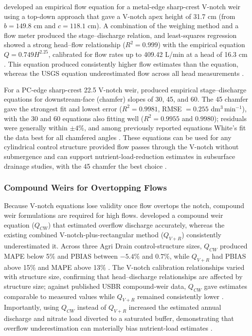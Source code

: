 \documentclass[11pt]{article}
\begin{document}
\textcite{BinShokrana2021} developed an empirical flow equation for a metal-edge
sharp-crest V-notch weir using a top-down approach that gave a V-notch apex height of
31.7 cm (from $b = 149.8$ cm and $c = 118.1$ cm). A combination of the weighing method and
a flow meter produced the stage--discharge relation, and least-squares regression showed a
strong head--flow relationship ($R^2 = 0.999$) with the empirical equation
$Q = 0.749 H^{2.25}$, calibrated for flow rates up to 409.42 L/min at a head of 16.3 cm
\parencite{BinShokrana2021}. This equation produced consistently higher flow estimates than
the \textcite{Christianson2019} equation, whereas the USGS equation underestimated flow
across all head measurements \parencite{BinShokrana2021}.

For a PC-edge sharp-crest 22.5\textdegree{} V-notch weir, \textcite{Napierala2023} produced
empirical stage--discharge equations for downstream-face (chamfer) slopes of 30\textdegree,
45\textdegree, and 60\textdegree. The 45\textdegree{} chamfer gave the strongest fit and
lowest error ($R^2 = 0.9981$, RMSE $= 0.255$ dm$^3$\,min$^{-1}$), with the 30\textdegree{}
and 60\textdegree{} equations also fitting well ($R^2 = 0.9955$ and $0.9980$); residuals
were generally within $\pm 4\%$, and among previously reported equations White's fit the
data best for all chamfered angles \parencite{Napierala2023}. These equations can be used
for any cylindrical control structure provided flow passes through the V-notch without
submergence and can support nutrient-load-reduction estimates in subsurface drainage
studies, with the 45\textdegree{} chamfer the best choice \parencite{Napierala2023}.

\subsubsection{Compound Weirs for Overtopping Flows}

Because V-notch equations lose validity once flow overtops the notch, compound weir
formulations are required for high flows. \textcite{Katuwal2024} developed a compound weir
equation ($Q_{CW}$) that estimated overflow discharge accurately, whereas the existing
combined V-notch-plus-rectangular method ($Q_{V+R}$) consistently underestimated it. Across
three Agri Drain control-structure sizes, $Q_{CW}$ produced MAPE below 5\% and PBIAS
between $-5.4\%$ and $0.7\%$, while $Q_{V+R}$ had PBIAS above 15\% and MAPE above 13\%
\parencite{Katuwal2024}. The V-notch calibration relationships varied with structure size,
confirming that head--discharge relationships are affected by structure size; against
published USBR compound-weir data, $Q_{CW}$ gave estimates comparable to measured values
while $Q_{V+R}$ remained consistently lower \parencite{Katuwal2024}. Importantly, using
$Q_{CW}$ instead of $Q_{V+R}$ increased the estimated annual discharge and nitrate load
diverted to a saturated buffer, demonstrating that overflow underestimation can materially
bias nutrient-load estimates \parencite{Katuwal2024}.
\end{document}
